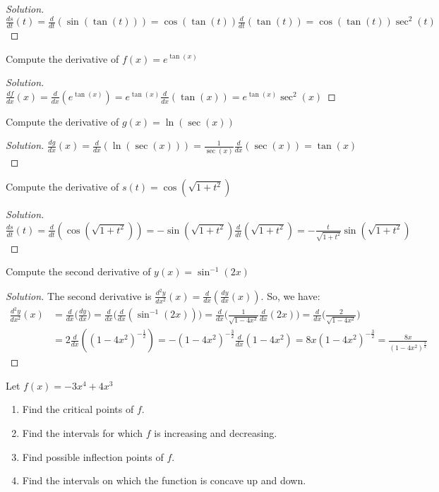 \documentclass[crop=false,class=book,oneside]{standalone}
\begin{document}
\begin{proof}[Solution]
$\frac{ds}{dt}(t)=\frac{d}{dt}(\sin(\tan(t)))=\cos(\tan(t))\frac{d}{dt}(\tan(t))=\cos(\tan(t))\sec^{2}(t)$
\end{proof}
\begin{problem}
Compute the derivative of $f(x)=e^{\tan(x)}$
\end{problem}
\begin{proof}[Solution]
$\frac{df}{dx}(x)=\frac{d}{dx}(e^{\tan(x)})=e^{\tan(x)}\frac{d}{dx}(\tan(x))=e^{\tan(x)}\sec^{2}(x)$
\end{proof}
\begin{problem}
Compute the derivative of $g(x)=\ln(\sec(x))$
\end{problem}
\begin{proof}[Solution]
$\frac{dg}{dx}(x)=\frac{d}{dx}(\ln(\sec(x)))=\frac{1}{\sec(x)}\frac{d}{dx}(\sec(x))=\tan(x)$
\end{proof}
\begin{problem}
Compute the derivative of $s(t)=\cos(\sqrt{1+t^{2}})$
\end{problem}
\begin{proof}[Solution]
$\frac{ds}{dt}(t)=\frac{d}{dt}(\cos(\sqrt{1+t^{2}}))=-\sin(\sqrt{1+t^{2}})\frac{d}{dt}(\sqrt{1+t^{2}})=-\frac{t}{\sqrt{1+t^{2}}}\sin(\sqrt{1+t^{2}})$
\end{proof}
\begin{problem}
Compute the second derivative of $y(x)=\sin^{-1}(2x)$
\end{problem}
\begin{proof}[Solution]
The second derivative is $\frac{d^{2}y}{dx^{2}}(x)=\frac{d}{dx}(\frac{dy}{dx}(x))$. So, we have:
\begin{align*}
    \frac{d^{2}y}{dx^{2}}(x)&=\frac{d}{dx}\big(\frac{dy}{dx}\big)=\frac{d}{dx}\big(\frac{d}{dx}(\sin^{-1}(2x))\big)=\frac{d}{dx}\big(\frac{1}{\sqrt{1-4x^{2}}}\frac{d}{dx}(2x)\big)=\frac{d}{dx}\big(\frac{2}{\sqrt{1-4x^{2}}}\big)\\
    &=2\frac{d}{dx}((1-4x^{2})^{-\frac{1}{2}})=-(1-4x^{2})^{-\frac{3}{2}}\frac{d}{dx}(1-4x^{2})=8x(1-4x^{2})^{-\frac{3}{2}}=\frac{8x}{(1-4x^{2})^{\frac{3}{2}}}
\end{align*}
\end{proof}
\begin{problem}
Let $f(x)=-3x^{4}+4x^{3}$
\begin{enumerate}
    \item Find the critical points of $f$.
    \item Find the intervals for which $f$ is increasing and decreasing.
    \item Find possible inflection points of $f$.
    \item Find the intervals on which the function is concave up and down.
\end{enumerate}
\end{problem}
\end{document}
